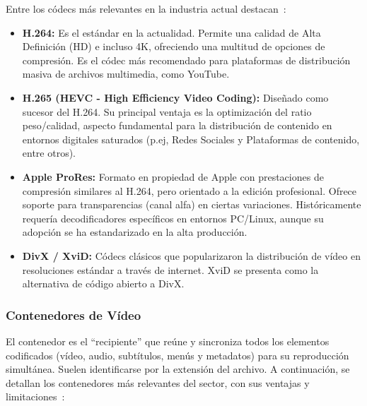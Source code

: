 Entre los códecs más relevantes en la industria actual destacan~\cite{tipo-formato-arch}:

\begin{itemize}
    \item \textbf{H.264:} Es el estándar en la actualidad. Permite una calidad de Alta Definición 
    (HD) e incluso 4K, ofreciendo una multitud de opciones de compresión. Es el códec más recomendado para 
    plataformas de distribución masiva de archivos multimedia, como YouTube.
    \item \textbf{H.265 (HEVC - High Efficiency Video Coding):} Diseñado como sucesor 
    del H.264. Su principal ventaja es la optimización del ratio peso/calidad, 
    aspecto fundamental para la distribución de contenido en entornos digitales saturados 
    (p.ej, Redes Sociales y Plataformas de contenido, entre otros).
    \item \textbf{Apple ProRes:} Formato en propiedad de Apple con prestaciones de 
    compresión similares al H.264, pero orientado a la edición profesional. Ofrece soporte para 
    transparencias (canal alfa) en ciertas variaciones. Históricamente requería decodificadores 
    específicos en entornos PC/Linux, aunque su adopción se ha estandarizado en la alta producción.
    \item \textbf{DivX / XviD:} Códecs clásicos que popularizaron la distribución 
    de vídeo en resoluciones estándar a través de internet. XviD se presenta como la alternativa de 
    código abierto a DivX.
\end{itemize}

\subsubsection{Contenedores de Vídeo}

El contenedor es el ``recipiente'' que reúne y sincroniza todos los elementos codificados 
(vídeo, audio, subtítulos, menús y metadatos) para su reproducción simultánea. Suelen identificarse por la 
extensión del archivo. A continuación, se detallan los contenedores más relevantes del sector, con sus ventajas y 
limitaciones~\cite{v-d-formato-video}:

